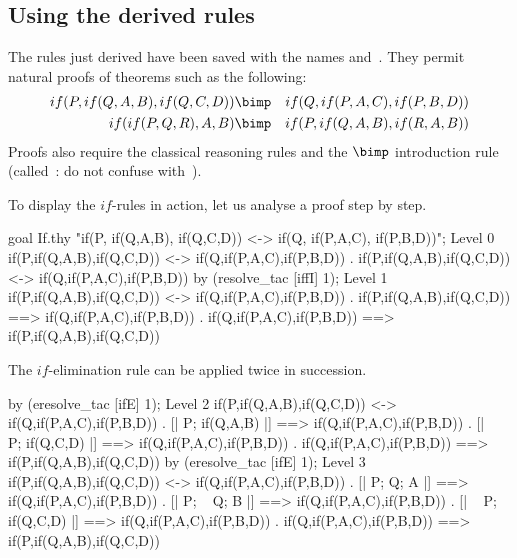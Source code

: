 \subsection{Using the derived rules}
The rules just derived have been saved with the {\ML} names 
and~.  They permit natural proofs of theorems such as the
following:
\begin{eqnarray*}
    if(P, if(Q,A,B), if(Q,C,D)) & \bimp & if(Q,if(P,A,C),if(P,B,D)) \\
    if(if(P,Q,R), A, B)         & \bimp & if(P,if(Q,A,B),if(R,A,B))
\end{eqnarray*}
Proofs also require the classical reasoning rules and the $\bimp$
introduction rule (called~: do not confuse with~). 

To display the $if$-rules in action, let us analyse a proof step by step.
\begin{ttbox}
goal If.thy
    "if(P, if(Q,A,B), if(Q,C,D)) <-> if(Q, if(P,A,C), if(P,B,D))";
{\out Level 0}
{\out if(P,if(Q,A,B),if(Q,C,D)) <-> if(Q,if(P,A,C),if(P,B,D))}
{. if(P,if(Q,A,B),if(Q,C,D)) <-> if(Q,if(P,A,C),if(P,B,D))}
\ttbreak
by (resolve_tac [iffI] 1);
{\out Level 1}
{\out if(P,if(Q,A,B),if(Q,C,D)) <-> if(Q,if(P,A,C),if(P,B,D))}
{. if(P,if(Q,A,B),if(Q,C,D)) ==> if(Q,if(P,A,C),if(P,B,D))}
{. if(Q,if(P,A,C),if(P,B,D)) ==> if(P,if(Q,A,B),if(Q,C,D))}
\end{ttbox}
The $if$-elimination rule can be applied twice in succession.
\begin{ttbox}
by (eresolve_tac [ifE] 1);
{\out Level 2}
{\out if(P,if(Q,A,B),if(Q,C,D)) <-> if(Q,if(P,A,C),if(P,B,D))}
{. [| P; if(Q,A,B) |] ==> if(Q,if(P,A,C),if(P,B,D))}
{. [| ~ P; if(Q,C,D) |] ==> if(Q,if(P,A,C),if(P,B,D))}
{. if(Q,if(P,A,C),if(P,B,D)) ==> if(P,if(Q,A,B),if(Q,C,D))}
\ttbreak
by (eresolve_tac [ifE] 1);
{\out Level 3}
{\out if(P,if(Q,A,B),if(Q,C,D)) <-> if(Q,if(P,A,C),if(P,B,D))}
{. [| P; Q; A |] ==> if(Q,if(P,A,C),if(P,B,D))}
{. [| P; ~ Q; B |] ==> if(Q,if(P,A,C),if(P,B,D))}
{. [| ~ P; if(Q,C,D) |] ==> if(Q,if(P,A,C),if(P,B,D))}
{. if(Q,if(P,A,C),if(P,B,D)) ==> if(P,if(Q,A,B),if(Q,C,D))}
\end{ttbox}

